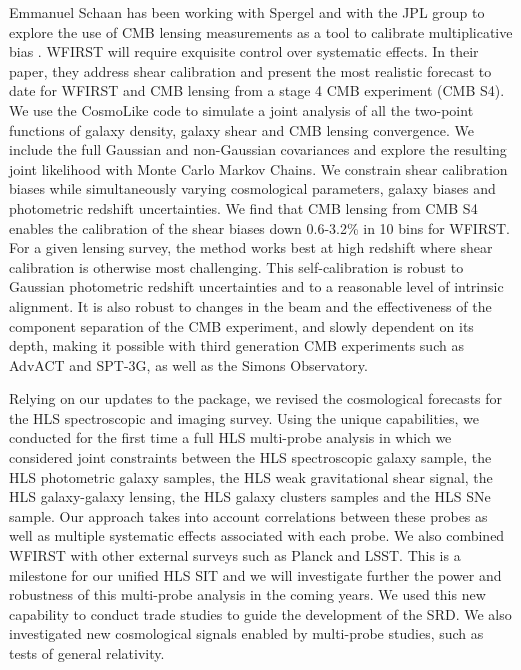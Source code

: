Emmanuel Schaan has been working with Spergel and with the JPL group to
explore the use of CMB  lensing measurements as a tool to calibrate
multiplicative bias \citep{Schaan:2016ois}.  WFIRST  will require exquisite control over systematic
effects. In their paper, they address shear calibration and present the most
realistic forecast to date for WFIRST and CMB lensing from a stage 4 CMB experiment
(CMB S4). We use the CosmoLike code to simulate a joint analysis of all the
two-point functions of galaxy density, galaxy shear and CMB lensing convergence.
We include the full Gaussian and non-Gaussian covariances and explore the
resulting joint likelihood with Monte Carlo Markov Chains. We constrain shear
calibration biases while simultaneously varying cosmological parameters, galaxy
biases and photometric redshift uncertainties. We find that CMB lensing from CMB
S4 enables the calibration of the shear biases down 0.6-3.2\% in 10 bins for
WFIRST. For a given lensing survey, the method works best at high redshift where
shear calibration is otherwise most challenging. This self-calibration is robust
to Gaussian photometric redshift uncertainties and to a reasonable level of
intrinsic alignment. It is also robust to changes in the beam and the
effectiveness of the component separation of the CMB experiment, and slowly
dependent on its depth, making it possible with third generation CMB experiments
such as AdvACT and SPT-3G, as well as the Simons Observatory.


\begin{summary}
Relying on our updates to the \CoLi package, we revised the cosmological
forecasts for the HLS spectroscopic and imaging survey. Using the unique \CoLi
capabilities, we conducted for the first time a full HLS multi-probe analysis in which we considered joint constraints between the HLS spectroscopic galaxy
sample, the HLS photometric galaxy samples, the HLS weak gravitational shear
signal, the HLS galaxy-galaxy lensing, the HLS galaxy clusters samples and the HLS SNe sample. Our
approach takes into account correlations between these probes as well as multiple systematic effects associated with each probe. We also combined WFIRST with other external surveys such as Planck and LSST. This is a milestone for our unified HLS SIT and we will investigate further the power and robustness of this multi-probe analysis in the coming years. We used this new capability to conduct trade studies to guide the development of the SRD. We also investigated new cosmological signals enabled by multi-probe studies, such as tests of general relativity.
\end{summary}
